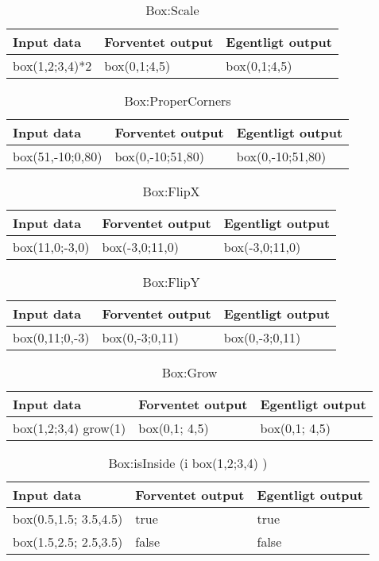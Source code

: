 \begin{table}[h!]
	\caption{Box:Scale}
	\centering
	\begin{tabular}{L L L}
		\hline\hline
		Input data & Forventet output & Egentligt output \\ [0.5ex]
		\hline
		box(1,2;3,4)*2 & box(0,1;4,5) & box(0,1;4,5)\\
		\hline
	\end{tabular}
\end{table}

\begin{table}[h!]
	\caption{Box:ProperCorners}
	\centering
	\begin{tabular}{L L L}
		\hline\hline
		Input data & Forventet output & Egentligt output \\ [0.5ex]
		\hline
		box(51,-10;0,80) & box(0,-10;51,80) & box(0,-10;51,80)\\
		\hline
	\end{tabular}
\end{table}

\begin{table}[h!]
	\caption{Box:FlipX}
	\centering
	\begin{tabular}{L L L}
		\hline\hline
		Input data & Forventet output & Egentligt output \\ [0.5ex]
		\hline
		box(11,0;-3,0) & box(-3,0;11,0) & box(-3,0;11,0)\\
		\hline
	\end{tabular}
\end{table}

\begin{table}[h!]
	\caption{Box:FlipY}
	\centering
	\begin{tabular}{L L L}
		\hline\hline
		Input data & Forventet output & Egentligt output \\ [0.5ex]
		\hline
		box(0,11;0,-3) & box(0,-3;0,11) & box(0,-3;0,11)\\
		\hline
	\end{tabular}
\end{table}

\begin{table}[h!]
	\caption{Box:Grow}
	\centering
	\begin{tabular}{L L L}
		\hline\hline
		Input data & Forventet output & Egentligt output \\ [0.5ex]
		\hline
		box(1,2;3,4) grow(1) & box(0,1; 4,5) & box(0,1; 4,5)\\
		\hline
	\end{tabular}
\end{table}

\begin{table}[h!]
	\caption{Box:isInside (i box(1,2;3,4) )}
	\centering
	\begin{tabular}{L L L}
		\hline\hline
		Input data & Forventet output & Egentligt output \\ [0.5ex]
		\hline
		box(0.5,1.5; 3.5,4.5) & true & true\\
		box(1.5,2.5; 2.5,3.5) & false & false\\
		\hline
	\end{tabular}
\end{table}